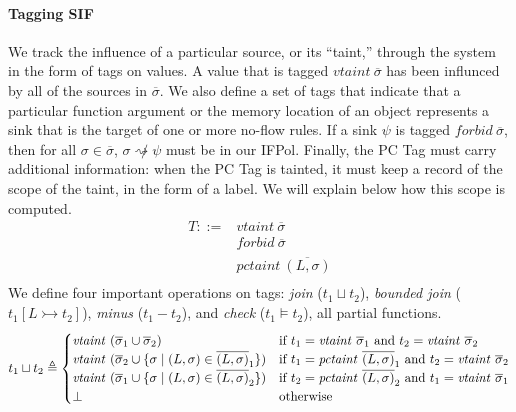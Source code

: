 \documentclass[acmsmall,review,anonymous]{acmart}\settopmatter{printfolios=true,printccs=false,printacmref=false}
\begin{document}
\paragraph{Tagging SIF}

We track the influence of a particular source, or its ``taint,'' through the system in the form
of tags on values. A value that is tagged \(\mathit{vtaint} ~ \overline{\sigma}\) has been influnced
by all of the sources in \(\overline{\sigma}\). We also define a set of tags that indicate that a
particular function argument or the memory location of an object represents a sink that is the
target of one or more no-flow rules. If a sink \(\psi\) is tagged
\(\mathit{forbid} ~ \overline{\sigma}\), then for all \(\sigma \in \overline{\sigma}\),
\(\sigma \not \rightsquigarrow \psi\) must be in our IFPol. Finally, the PC Tag must carry additional
information: when the PC Tag is tainted, it must keep a record of the scope of the taint, in the form
of a label. We will explain below how this scope is computed.
%
\begin{align*}
  T ::= & \mathit{vtaint} ~ \overline{\sigma} \\
  & \mathit{forbid} ~ \overline{\sigma} \\
  & \mathit{pctaint} ~ \overline{(L,\sigma)} \\
\end{align*}
%
We define four important operations on tags: {\em join} (\(t_1 \sqcup t_2\)), {\em bounded join}
(\(t_1 [L \rightarrowtail t_2]\)), {\em minus} (\(t_1 - t_2\)), and {\em check} (\(t_1 \models t_2\)),
all partial functions.
%
\[t_1 \sqcup t_2 \triangleq
\begin{cases}
  \mathit{vtaint} ~ (\overline{\sigma}_1 \cup \overline{\sigma}_2) &
  \textnormal{if } t_1 = \mathit{vtaint} ~ \overline{\sigma}_1 \textnormal{ and }
  t_2 = \mathit{vtaint} ~ \overline{\sigma}_2\\
  \mathit{vtaint} ~ (\overline{\sigma}_2 \cup \{\sigma \mid (L,\sigma) \in \overline{(L,\sigma)}_1\}) &
  \textnormal{if } t_1 = \mathit{pctaint} ~ \overline{(L,\sigma)}_1 \textnormal{ and }
  t_2 = \mathit{vtaint} ~ \overline{\sigma}_2\\
  \mathit{vtaint} ~ (\overline{\sigma}_1 \cup \{\sigma \mid (L,\sigma) \in \overline{(L,\sigma)}_2\}) &
  \textnormal{if } t_2 = \mathit{pctaint} ~ \overline{(L,\sigma)}_2 \textnormal{ and }
  t_1 = \mathit{vtaint} ~ \overline{\sigma}_1\\
  \bot & \textnormal{otherwise} \\
\end{cases}\]
\end{document}
